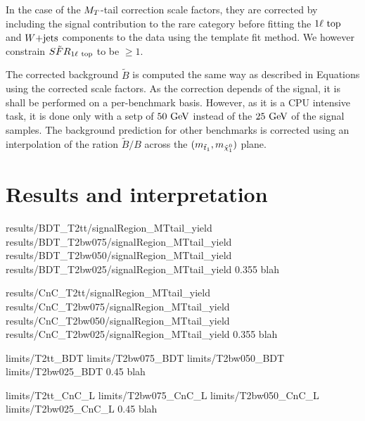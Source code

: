         In the case of the $M_T$-tail correction scale factors, they are corrected by including the signal contribution
        to the rare category before fitting the $1\ell~\text{top}$ and $\text{$W$+jets}$ components to the data using the template
        fit method. We however constrain $\tilde{SFR}_{1\ell~\text{top}}$ to be $\geq 1$.

        The corrected background $\tilde{B}$ is computed the same way as described in Equations 
        using the corrected scale factors. As the correction depends of the signal, it is shall be performed on a per-benchmark
        basis. However, as it is a CPU intensive task, it is done only with a setp of $50 ~\text{GeV}$ instead of the $25 ~\text{GeV}$
        of the signal samples. The background prediction for other benchmarks is corrected using an interpolation of
        the ration $\tilde{B}/B$ across the $(m_{\tilde{t}_1},m_{\tilde{\chi}_1^0})$ plane.

    \section{Results and interpretation \label{sec:analysis_results}}
        \loremipsum

                          {results/BDT_T2tt/signalRegion_MTtail_yield}
                          {results/BDT_T2bw075/signalRegion_MTtail_yield}
                          {results/BDT_T2bw050/signalRegion_MTtail_yield}
                          {results/BDT_T2bw025/signalRegion_MTtail_yield}
                          {0.355}
                          {blah}

                          {results/CnC_T2tt/signalRegion_MTtail_yield}
                          {results/CnC_T2bw075/signalRegion_MTtail_yield}
                          {results/CnC_T2bw050/signalRegion_MTtail_yield}
                          {results/CnC_T2bw025/signalRegion_MTtail_yield}
                          {0.355}
                          {blah}

                          {limits/T2tt_BDT}
                          {limits/T2bw075_BDT}
                          {limits/T2bw050_BDT}
                          {limits/T2bw025_BDT}
                          {0.45}
                          {blah}

                          {limits/T2tt_CnC_L}
                          {limits/T2bw075_CnC_L}
                          {limits/T2bw050_CnC_L}
                          {limits/T2bw025_CnC_L}
                          {0.45}
                          {blah}

